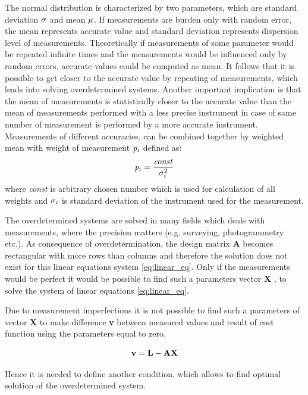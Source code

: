 \documentclass[a4paper,12pt]{article}
\newcommand{\ematr}[1]{
{\bf #1}
}
\newcommand{\evect}[1]{
{\bf #1}
}
\newcommand{\escal}[1]{
{\it #1}
}
\begin{document}
\begin{itemize}
The normal distribution is characterized by two parameters, which are standard deviation 
$\escal{\sigma}$ and mean $\escal{\mu}$. 
If measurements are burden only with random error, the mean represents accurate value and standard deviation represents 
dispersion level of measurements. 
Theoretically  if measurements of some parameter would be repeated infinite times and the measurements would be influenced only by random errors,
accurate values could be computed as mean.
It follows that it is possible to get closer to the accurate value by repeating of measurements, which 
leads into solving overdetermined systems. Another important implication 
is that the mean of measurements is statistically closer to the accurate value than the mean of measurements performed
with a less precise instrument in case of same number of measurement is performed by a more accurate 
instrument.
Measurements of different accuracies, can be combined together by weighted mean
with weight of measurement $\escal{p}_{i}$ defined as:
\begin{equation}
\label{eq:wmean}
\escal{p}_{i} = \frac{\escal{const}}{\escal{\sigma}_{i}^{2}}
\end{equation} 
where \escal{const} is arbitrary chosen number which is used for calculation of all weights 
and $\escal{\sigma_{i}}$ is standard deviation of the instrument used for the measurement.
\end{itemize}

The overdetermined systems are solved in many fields which deals with measurements, where the precision matters (e.g. 
surveying, photogrammetry etc.).
As consequence of overdetermination, the design matrix \ematr{A} becomes rectangular with more rows than columns 
and therefore the solution does not exist for this linear equations system \eqref{eq:linear_eq}.
Only if the measurements would be perfect it would be possible to find such a parameters vector \evect{X}, to 
solve the system of linear equations \eqref{eq:linear_eq}. 

Due to measurement imperfections it is not possible to find such a parameters of vector \evect{X} to make difference \evect{v} between measured values and 
result of cost function using the parameters equal to zero.

\begin{equation}
\label{eq:least_v}
\evect{v} = \evect{L} - \ematr{A}\evect{X}
\end{equation} 



Hence it is needed to define another condition, which allows to find optimal solution of the 
overdetermined system.
\end{document}
